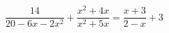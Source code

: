 \begin{ex}[type=equation]
	\begin{condition}
		$\dfrac{14}{20 -6x - 2x^2} + \dfrac{x^2 + 4x}{x^2 + 5x} = \dfrac{x + 3}{2 - x} + 3$
	\end{condition}
\end{ex}